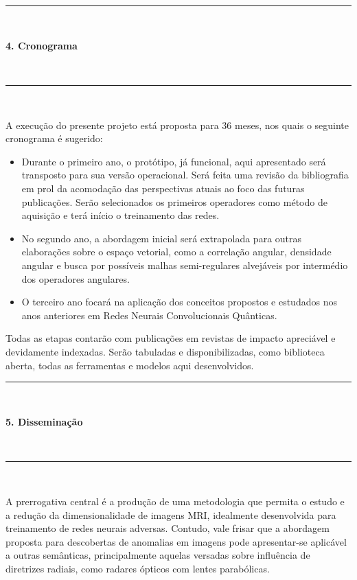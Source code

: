 \documentclass[a4paper, 12pt]{report}
\begin{document}
$\frac{}{}$\\
\hrule $\frac{}{}$\\
\begin{LARGE}
	\textbf{4. Cronograma}
\end{LARGE}
\\ \hrule $\frac{}{}$\par

A execução do presente projeto está proposta para 36 meses, nos quais o seguinte cronograma é sugerido:
\begin{itemize}
    \item Durante o primeiro ano, o protótipo, já funcional, aqui apresentado será transposto para sua versão operacional. Será feita uma revisão da bibliografia em prol da acomodação das perspectivas atuais ao foco das futuras publicações. Serão selecionados os primeiros operadores como método de aquisição e terá início o treinamento das redes.
    \item No segundo ano, a abordagem inicial será extrapolada para outras elaborações sobre o espaço vetorial, como a correlação angular, densidade angular e busca por possíveis malhas semi-regulares alvejáveis por intermédio dos operadores angulares.
    \item O terceiro ano focará na aplicação dos conceitos propostos e estudados nos anos anteriores em Redes Neurais Convolucionais Quânticas.
\end{itemize}

Todas as etapas contarão com publicações em revistas de impacto apreciável e devidamente indexadas. Serão tabuladas e disponibilizadas, como biblioteca aberta, todas as ferramentas e modelos aqui desenvolvidos.

\newpage
\hrule $\frac{}{}$\\
\begin{LARGE}
	\textbf{5. Disseminação}
\end{LARGE}
\\ \hrule $\frac{}{}$\par
\label{chap:disseminacao}

A prerrogativa central é a produção de uma metodologia que permita o estudo e a redução da dimensionalidade de imagens MRI, idealmente desenvolvida para treinamento de redes neurais adversas. Contudo, vale frisar que a abordagem proposta para descobertas de anomalias em imagens pode apresentar-se aplicável a outras semânticas, principalmente aquelas versadas sobre influência de diretrizes radiais, como radares ópticos com lentes parabólicas.   
\end{document}
